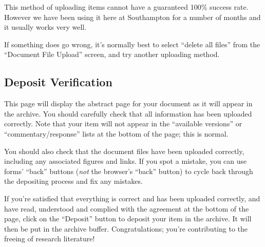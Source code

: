 This method of uploading items cannot have a guaranteed 100\% success rate. However we have been using it here at Southampton for a number of months and it usually works very well.

If something does go wrong, it's normally best to select ``delete all files'' from the ``Document File Upload'' screen, and try another uploading method.


\subsection{Deposit Verification}

This page will display the abstract page for your document as it will appear in the archive. You should carefully check that all information has been uploaded correctly. Note that your item will not appear in the ``available versions'' or ``commentary/response'' lists at the bottom of the page; this is normal.

You should also check that the document files have been uploaded correctly, including any associated figures and links. If you spot a mistake, you can use forms' ``back'' buttons (\emph{not} the browser's ``back'' button) to cycle back through the depositing process and fix any mistakes.

If you're satisfied that everything is correct and has been uploaded correctly, and have read, understood and complied with the agreement at the bottom of the page, click on the ``Deposit'' button to deposit your item in the archive. It will then be put in the archive buffer. Congratulations; you're contributing to the freeing of research literature!
